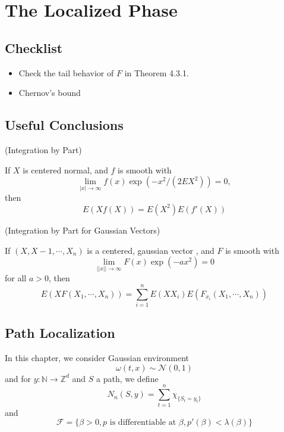 \section{The Localized Phase}

\subsection{Checklist}
\begin{itemize}
    \item Check the tail behavior of $F$ in Theorem 4.3.1.
    \item Chernov's bound
\end{itemize}
\subsection{Useful Conclusions}

\begin{lemma}
    (Integration by Part)\par
    If $X$ is centered normal, and $f$ is smooth with
    \[
    \lim_{|x|\to\infty} f(x)\exp(-x^2/(2EX^2)) = 0,
    \]
    then
    \[E(Xf(X)) = E(X^2)E(f'(X))\]
\end{lemma}

\begin{corollary}
    (Integration by Part for Gaussian Vectors)\par If $(X,X-1,\cdots,X_n)$ is a centered, gaussian vector , and $F$ is smooth with
    \[
    \lim_{||x||\to\infty} F(x)\exp(-ax^2) = 0
    \]
    for all $a>0$, then
    \[
    E(XF(X_1,\cdots,X_n)) = \sum\limits_{i=1}^n E(XX_i)E(F_{x_i}(X_1,\cdots,X_n))
    \]
\end{corollary}
\subsection{Path Localization}

\begin{definition}
    In this chapter, we consider Gaussian environment
    \[
    \omega(t,x) \sim \mathcal{N}(0,1)
    \]
    and for $y:\mathbb{N}\to\mathbb{Z}^d$ and $S$ a path, we define
    \[
    N_n(S,y) = \sum\limits_{t=1}^n \chi_{\{S_t = y_t\}}
    \]
    and
    \[\mathcal{F} = \{\beta > 0, p\text{ is differentiable at }\beta,p'(\beta) < \lambda(\beta)\}\]
\end{definition}

